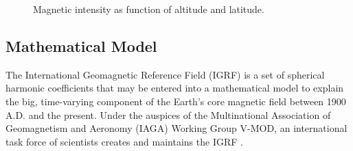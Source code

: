 \begin{figure}[H]
\begin{subfigure}[b]{0.48\textwidth}
              \label{fig:lat}
     \end{subfigure}
     \caption{Magnetic intensity as function of altitude and latitude.}

\end{figure}

\subsection{Mathematical Model}
\label{sec:igrf_math}
The International Geomagnetic Reference Field (IGRF) is a set of spherical harmonic coefficients that may be entered into a mathematical model to explain the big, time-varying component of the Earth's core magnetic field between 1900 A.D. and the present. Under the auspices of the Multinational Association of Geomagnetism and Aeronomy (IAGA) Working Group V-MOD, an international task force of scientists creates and maintains the IGRF \cite{alken2021international}.

